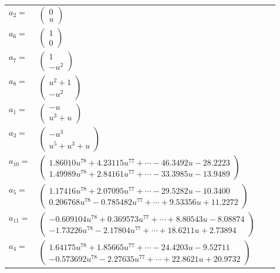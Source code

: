 \documentclass[1p]{elsarticle_modified}
\theoremstyle{definition}
\begin{document}
\begin{tabular}{m{7pt} m{180pt} m{7pt} m{180pt} }
\flushright $a_{2}=$&$\begin{pmatrix}0\\u\end{pmatrix}$ \\
\flushright $a_{6}=$&$\begin{pmatrix}1\\0\end{pmatrix}$ \\
\flushright $a_{7}=$&$\begin{pmatrix}1\\- u^2\end{pmatrix}$ \\
\flushright $a_{8}=$&$\begin{pmatrix}u^2+1\\- u^2\end{pmatrix}$ \\
\flushright $a_{1}=$&$\begin{pmatrix}- u\\u^3+u\end{pmatrix}$ \\
\flushright $a_{3}=$&$\begin{pmatrix}- u^3\\u^5+u^3+u\end{pmatrix}$ \\
\flushright $a_{10}=$&$\begin{pmatrix}1.86010 u^{78}+4.23115 u^{77}+\cdots-46.3492 u-28.2223\\1.49989 u^{78}+2.84161 u^{77}+\cdots-33.3985 u-13.9489\end{pmatrix}$ \\
\flushright $a_{5}=$&$\begin{pmatrix}1.17416 u^{78}+2.07095 u^{77}+\cdots-29.5282 u-10.3400\\0.206768 u^{78}-0.785482 u^{77}+\cdots+9.53356 u+11.2272\end{pmatrix}$ \\
\flushright $a_{11}=$&$\begin{pmatrix}-0.609104 u^{78}+0.369573 u^{77}+\cdots+8.80543 u-8.08874\\-1.73226 u^{78}-2.17804 u^{77}+\cdots+18.6211 u+2.73894\end{pmatrix}$ \\
\flushright $a_{4}=$&$\begin{pmatrix}1.64175 u^{78}+1.85665 u^{77}+\cdots-24.4203 u-9.52711\\-0.573692 u^{78}-2.27635 u^{77}+\cdots+22.8621 u+20.9732\end{pmatrix}$ \\

\end{tabular}
\end{document}
